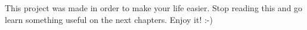 This project was made in order to make your life easier. Stop reading this and go learn something useful on the next chapters. Enjoy it! :-)